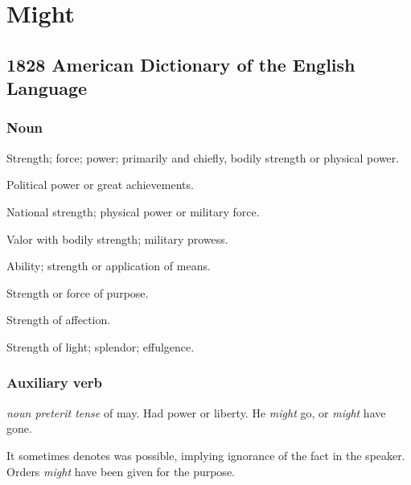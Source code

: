 \section{Might}
	\label{MIGHT}
	

\subsection{1828 American Dictionary of the English Language} %
	\label{MIGHT-1828}
	
	\subsubsection{Noun}

		\begin{compactitem}
			\item[1] Strength; force; power; primarily and chiefly, bodily strength or physical power.
			\item[2] Political power or great achievements.
			\item[3] National strength; physical power or military force.
			\item[4] Valor with bodily strength; military prowess.
			\item[5] Ability; strength or application of means.
			\item[6] Strength or force of purpose.
			\item[7] Strength of affection.
			\item[8] Strength of light; splendor; effulgence.
		\end{compactitem}
		
	\subsubsection{Auxiliary verb}

		\begin{compactitem}
			\item \textit{noun preterit tense} of may. Had power or liberty. He \textit{might} go, or \textit{might} have gone.
			\item[1] It sometimes denotes was possible, implying ignorance of the fact in the speaker. Orders \textit{might} have been given for the purpose.
		\end{compactitem}



